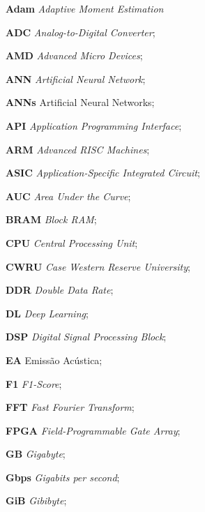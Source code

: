 \documentclass[
	12pt,				%
	oneside,
	a4paper,			%
	english,			%
	french,				%
	spanish,			%
	brazil				%
	]{abntex2}
\newcommand{\listofquadrosname}{Lista de quadros}
\begin{document}
\pagebreak
{}
\listoffigures*
\cleardoublepage


\listoftables*
\cleardoublepage

\begin{siglas}
	\item[\textbf{Adam}] \textit{Adaptive Moment Estimation}
	\item[\textbf{ADC}] \textit{Analog-to-Digital Converter};	
	\item[\textbf{AMD}] \textit{Advanced Micro Devices};
	\item[\textbf{ANN}] \textit{Artificial Neural Network};
	\item[\textbf{ANNs}] Artificial Neural Networks;
	\item[\textbf{API}] \textit{Application Programming Interface};
	\item[\textbf{ARM}] \textit{Advanced RISC Machines};
	\item[\textbf{ASIC}] \textit{Application-Specific Integrated Circuit};
	\item[\textbf{AUC}] \textit{Area Under the Curve};
	\item[\textbf{BRAM}] \textit{Block RAM};
	\item[\textbf{CPU}] \textit{Central Processing Unit};
	\item[\textbf{CWRU}] \textit{Case Western Reserve University};
	\item[\textbf{DDR}] \textit{Double Data Rate};
	\item[\textbf{DL}] \textit{Deep Learning};
	\item[\textbf{DSP}] \textit{Digital Signal Processing Block};
	\item[\textbf{EA}] Emissão Acústica;
	\item[\textbf{F1}] \textit{F1-Score};
	\item[\textbf{FFT}] \textit{Fast Fourier Transform};
	\item[\textbf{FPGA}] \textit{Field-Programmable Gate Array};
	\item[\textbf{GB}] \textit{Gigabyte};
	\item[\textbf{Gbps}] \textit{Gigabits per second};
	\item[\textbf{GiB}] \textit{Gibibyte};

\end{siglas}
\end{document}
